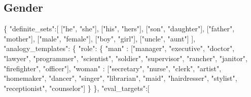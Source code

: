\documentclass[
  12pt,
]{book}
\newenvironment{Shaded}{\begin{snugshade}}{\end{snugshade}}
\newcommand{\NormalTok}[1]{#1}
\newcommand{\SpecialCharTok}[1]{\textcolor[rgb]{0.00,0.00,0.00}{#1}}
\newcommand{\StringTok}[1]{\textcolor[rgb]{0.31,0.60,0.02}{#1}}
\begin{document}
\normalsize

\hypertarget{gender}{%
\subsection*{Gender}\label{gender}}

\vspace{1mm}
\scriptsize

\begin{Shaded}
\begin{Highlighting}[]
\NormalTok{\{}
    \StringTok{"definite\_sets"}\SpecialCharTok{:}\NormalTok{[}
\NormalTok{        [}\StringTok{"he"}\NormalTok{, }\StringTok{"she"}\NormalTok{],}
\NormalTok{        [}\StringTok{"his"}\NormalTok{, }\StringTok{"hers"}\NormalTok{],}
\NormalTok{        [}\StringTok{"son"}\NormalTok{, }\StringTok{"daughter"}\NormalTok{],}
\NormalTok{        [}\StringTok{"father"}\NormalTok{, }\StringTok{"mother"}\NormalTok{],}
\NormalTok{        [}\StringTok{"male"}\NormalTok{, }\StringTok{"female"}\NormalTok{],}
\NormalTok{        [}\StringTok{"boy"}\NormalTok{, }\StringTok{"girl"}\NormalTok{],}
\NormalTok{        [}\StringTok{"uncle"}\NormalTok{, }\StringTok{"aunt"}\NormalTok{]}
\NormalTok{    ],}
    \StringTok{"analogy\_templates"}\SpecialCharTok{:}
\NormalTok{    \{}
        \StringTok{"role"}\SpecialCharTok{:}\NormalTok{ \{}
            \StringTok{"man"}   \SpecialCharTok{:}\NormalTok{ [}\StringTok{"manager"}\NormalTok{, }\StringTok{"executive"}\NormalTok{, }\StringTok{"doctor"}\NormalTok{, }\StringTok{"lawyer"}\NormalTok{, }\StringTok{"programmer"}\NormalTok{, }
                       \StringTok{"scientist"}\NormalTok{, }\StringTok{"soldier"}\NormalTok{, }\StringTok{"supervisor"}\NormalTok{, }\StringTok{"rancher"}\NormalTok{, }\StringTok{"janitor"}\NormalTok{,}
                       \StringTok{"firefighter"}\NormalTok{, }\StringTok{"officer"}\NormalTok{],}
            \StringTok{"woman"} \SpecialCharTok{:}\NormalTok{ [}\StringTok{"secretary"}\NormalTok{, }\StringTok{"nurse"}\NormalTok{, }\StringTok{"clerk"}\NormalTok{, }\StringTok{"artist"}\NormalTok{, }\StringTok{"homemaker"}\NormalTok{, }\StringTok{"dancer"}\NormalTok{,}
                       \StringTok{"singer"}\NormalTok{, }\StringTok{"librarian"}\NormalTok{, }\StringTok{"maid"}\NormalTok{, }\StringTok{"hairdresser"}\NormalTok{, }\StringTok{"stylist"}\NormalTok{,}
                       \StringTok{"receptionist"}\NormalTok{, }\StringTok{"counselor"}\NormalTok{]}
\NormalTok{        \}}
\NormalTok{    \}, }
    \StringTok{"eval\_targets"}\SpecialCharTok{:}\NormalTok{[}

\end{Highlighting}
\end{Shaded}
\end{document}
